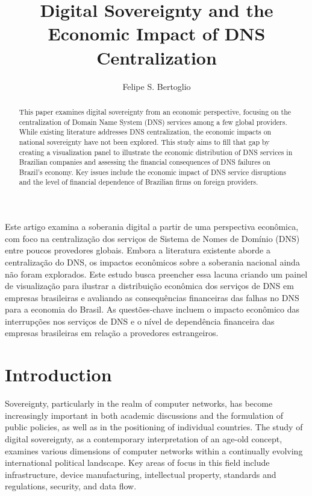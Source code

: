 \documentclass[12pt]{article}
\title{Digital Sovereignty and the Economic Impact of DNS Centralization}
\author{Felipe S. Bertoglio\inst{1}}
\begin{document}
 

\maketitle

\begin{abstract}
  This paper examines digital sovereignty from an economic perspective, focusing on the centralization of Domain Name System (DNS) services among a few global providers. While existing literature addresses DNS centralization, the economic impacts on national sovereignty have not been explored. This study aims to fill that gap by creating a visualization panel to illustrate the economic distribution of DNS services in Brazilian companies and assessing the financial consequences of DNS failures on Brazil’s economy. Key issues include the economic impact of DNS service disruptions and the level of financial dependence of Brazilian firms on foreign providers.
\end{abstract}
     
\begin{resumo} 
  Este artigo examina a soberania digital a partir de uma perspectiva econômica, com foco na centralização dos serviços de Sistema de Nomes de Domínio (DNS) entre poucos provedores globais. Embora a literatura existente aborde a centralização do DNS, os impactos econômicos sobre a soberania nacional ainda não foram explorados. Este estudo busca preencher essa lacuna criando um painel de visualização para ilustrar a distribuição econômica dos serviços de DNS em empresas brasileiras e avaliando as consequências financeiras das falhas no DNS para a economia do Brasil. As questões-chave incluem o impacto econômico das interrupções nos serviços de DNS e o nível de dependência financeira das empresas brasileiras em relação a provedores estrangeiros.
\end{resumo}


\section{Introduction}

Sovereignty, particularly in the realm of computer networks, has become increasingly important in both academic discussions and the formulation of public policies, as well as in the positioning of individual countries. The study of digital sovereignty, as a contemporary interpretation of an age-old concept, examines various dimensions of computer networks within a continually evolving international political landscape. Key areas of focus in this field include infrastructure, device manufacturing, intellectual property, standards and regulations, security, and data flow. 
\end{document}
